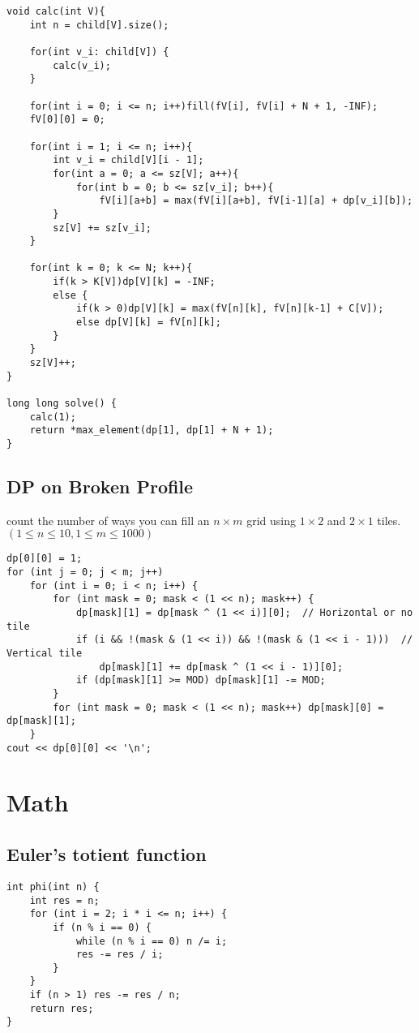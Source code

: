 \documentclass[11pt,a4paper]{article}
\begin{document}
\begin{multicols*}{2}
\begin{lstlisting}
void calc(int V){
    int n = child[V].size();

    for(int v_i: child[V]) {
        calc(v_i);
    }

    for(int i = 0; i <= n; i++)fill(fV[i], fV[i] + N + 1, -INF);    
    fV[0][0] = 0;                                                   

    for(int i = 1; i <= n; i++){
        int v_i = child[V][i - 1];
        for(int a = 0; a <= sz[V]; a++){        
            for(int b = 0; b <= sz[v_i]; b++){
                fV[i][a+b] = max(fV[i][a+b], fV[i-1][a] + dp[v_i][b]);  
        }
        sz[V] += sz[v_i];
    }

    for(int k = 0; k <= N; k++){
        if(k > K[V])dp[V][k] = -INF;                                
        else {                                                      
            if(k > 0)dp[V][k] = max(fV[n][k], fV[n][k-1] + C[V]);   
            else dp[V][k] = fV[n][k];                               
        }
    }
    sz[V]++;
}

long long solve() {
    calc(1);
    return *max_element(dp[1], dp[1] + N + 1);
}
\end{lstlisting}

\subsection{DP on Broken Profile}
count the number of ways you can fill an $n \times m$ grid using $1 \times 2$ and $2 \times 1$ tiles.
$(1 \le n \le 10, 1 \le m \le 1000)$
\begin{lstlisting}
dp[0][0] = 1;
for (int j = 0; j < m; j++)
    for (int i = 0; i < n; i++) {
        for (int mask = 0; mask < (1 << n); mask++) {
            dp[mask][1] = dp[mask ^ (1 << i)][0];  // Horizontal or no tile
            if (i && !(mask & (1 << i)) && !(mask & (1 << i - 1)))  // Vertical tile
                dp[mask][1] += dp[mask ^ (1 << i - 1)][0];
            if (dp[mask][1] >= MOD) dp[mask][1] -= MOD;
        }
        for (int mask = 0; mask < (1 << n); mask++) dp[mask][0] = dp[mask][1];
    }
cout << dp[0][0] << '\n';
\end{lstlisting}

\section{Math}
\subsection{Euler's totient function}
\begin{lstlisting}
int phi(int n) {
    int res = n;
    for (int i = 2; i * i <= n; i++) {
        if (n % i == 0) {
            while (n % i == 0) n /= i;
            res -= res / i;
        }
    }
    if (n > 1) res -= res / n;
    return res;
}
\end{lstlisting}


\end{multicols*}
\end{document}
